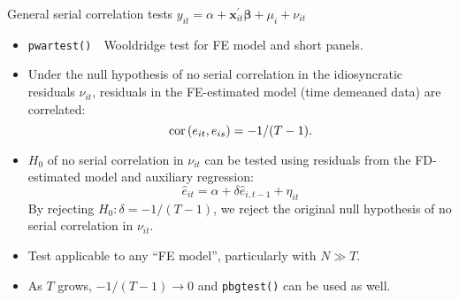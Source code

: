 \documentclass{beamer}
\begin{document}
\begin{frame}{General serial correlation tests}
$y_{it} = \alpha + \bm{x}^{\prime}_{it} \bm{\beta} + \mu_i + \nu_{it}$\\ \medskip
\begin{itemize}
    \item \texttt{pwartest()}~~Wooldridge test for FE model and short panels.\\
    \smallskip
    \item Under the null hypothesis of no serial correlation in the idiosyncratic residuals $\nu_{it}$, residuals in the FE-estimated model (time demeaned data) are correlated: $$\textnormal{cor}\left(e_{it},e_{is}\right)=-1/(T-1).$$
    \item $H_0$ of no serial correlation in $\nu_{it}$ can be tested using residuals from the FD-estimated model and auxiliary regression:
    $$ \hat{e}_{it} = \alpha + \delta \hat{e}_{i,t-1} + \eta_{it}$$
    By rejecting $H_0: \delta = -1/(T-1)$, we reject the original null hypothesis of no serial correlation in  $\nu_{it}$.
    \smallskip
    \item Test applicable to any ``FE model'', particularly with $N \gg T$.
    \smallskip
    \item As $T$ grows, $-1/(T-1) \rightarrow 0$ and \texttt{pbgtest()} can be used as well.
\end{itemize}
\end{frame}
\end{document}
